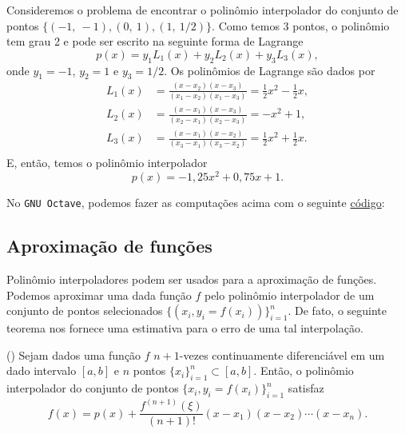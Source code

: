 \begin{ex}
  Consideremos o problema de encontrar o polinômio interpolador do conjunto de pontos $\{(-1,~-1), (0,~1), (1,~1/2)\}$. Como temos 3 pontos, o polinômio tem grau 2 e pode ser escrito na seguinte forma de Lagrange
  \begin{equation}
    p(x) = y_1L_1(x) + y_2L_2(x) + y_3L_3(x),
  \end{equation}
  onde $y_1 = -1$, $y_2 = 1$ e $y_3 = 1/2$. Os polinômios de Lagrange são dados por
  \begin{align}
    L_1(x) &= \frac{(x-x_2)(x-x_3)}{(x_1-x_2)(x_1-x_3)} = \frac{1}{2}x^2 - \frac{1}{2}x,\\
    L_2(x) &= \frac{(x-x_1)(x-x_3)}{(x_2-x_1)(x_2-x_3)} = -x^2 + 1,\\
    L_3(x) &= \frac{(x-x_1)(x-x_2)}{(x_3-x_1)(x_3-x_2)} = \frac{1}{2}x^2 + \frac{1}{2}x.\\
  \end{align}
  E, então, temos o polinômio interpolador
  \begin{equation}
    p(x) = -1,25x^2 + 0,75x + 1.
  \end{equation}

\ifisoctave
No \verb+GNU Octave+, podemos fazer as computações acima com o seguinte \href{https://github.com/phkonzen/notas/blob/master/src/MatematicaNumerica/cap_interp/dados/ex_interpoli_lagrange/ex_interpoli_lagrange.m}{código}:

\fi
\end{ex}

\subsection{Aproximação de funções}

Polinômio interpoladores podem ser usados para a aproximação de funções. Podemos aproximar uma dada função $f$ pelo polinômio interpolador de um conjunto de pontos selecionados $\{(x_i, y_i=f(x_i))\}_{i=1}^n$. De fato, o seguinte teorema nos fornece uma estimativa para o erro de uma tal interpolação.

\begin{teo}()\label{teo:lagrange}
  Sejam dados uma função $f$ $n+1$-vezes continuamente diferenciável em um dado intervalo $[a, b]$ e $n$ pontos $\{x_i\}_{i=1}^n\subset [a, b]$. Então, o polinômio interpolador do conjunto de pontos $\{x_i, y_i=f(x_i)\}_{i=1}^n$ satisfaz
  \begin{equation}
    f(x) = p(x) + \frac{f^{(n+1)}(\xi)}{(n+1)!}(x-x_1)(x-x_2)\cdots (x-x_n).
  \end{equation}
\end{teo}
\begin{dem}
  \emconstrucao
\end{dem}

